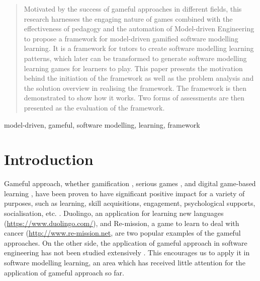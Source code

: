 \documentclass[conference]{IEEEtran}
\begin{document}
\maketitle

\begin{abstract}
\label{abstract}
Motivated by the success of gameful approaches in different fields, this research harnesses the engaging nature of games combined with the effectiveness of pedagogy and the automation of Model-driven Engineering to propose a framework for model-driven gamified software modelling learning. It is a framework for tutors to create software modelling learning patterns, which later can be transformed to generate software modelling learning games for learners to play. This paper presents the motivation behind the initiation of the framework as well as the problem analysis and the solution overview in realising the framework. The framework is then demonstrated to show how it works. Two forms of assessments are then presented as the evaluation of the framework.
\end{abstract}

\begin{IEEEkeywords} 
model-driven, gameful, software modelling, learning, framework
\end{IEEEkeywords}



%
\IEEEpeerreviewmaketitle

\section{Introduction}
Gameful approach, whether gamification \cite{stieglitz2016gamification}, serious games \cite{dorner2016serious}, and digital game-based learning \cite{san2015games}, have been proven to have significant positive impact for a variety of purposes, such as learning, skill acquisitions, engagement, psychological supports, socialisation, etc. \cite{connolly2012systematic, hamari2014does}. Duolingo, an application for learning new languages (\url{https://www.duolingo.com/}), and Re-mission, a game to learn to deal with cancer (\url{http://www.re-mission.net}, are two popular examples of the gameful approaches. On the other side, the application of gameful approach in software engineering has not been studied extensively \cite{Pedreira2015}. This encourages us to apply it in software modelling learning, an area which has received little attention for the application of gameful approach so far. 
\end{document}
